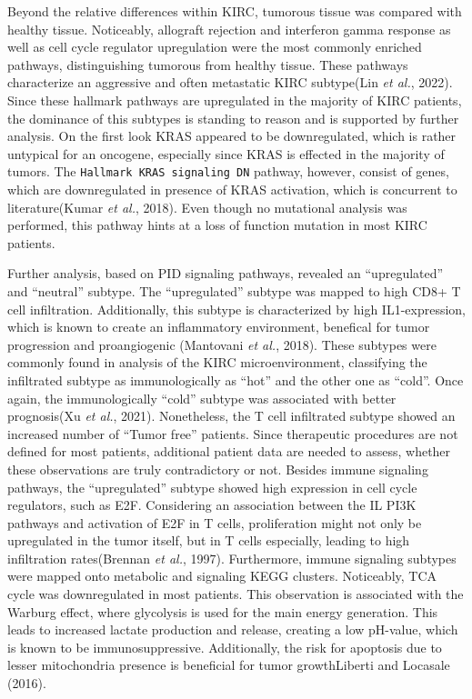 \documentclass[
  parskip,
  oneside]{scrreprt}
\begin{document}
Beyond the relative differences within KIRC, tumorous tissue was
compared with healthy tissue. Noticeably, allograft rejection and
interferon gamma response as well as cell cycle regulator upregulation
were the most commonly enriched pathways, distinguishing tumorous from
healthy tissue. These pathways characterize an aggressive and often
metastatic KIRC subtype(Lin \emph{et al.}, 2022). Since these hallmark
pathways are upregulated in the majority of KIRC patients, the dominance
of this subtypes is standing to reason and is supported by further
analysis. On the first look KRAS appeared to be downregulated, which is
rather untypical for an oncogene, especially since KRAS is effected in
the majority of tumors. The \texttt{Hallmark\ KRAS\ signaling\ DN}
pathway, however, consist of genes, which are downregulated in presence
of KRAS activation, which is concurrent to literature(Kumar \emph{et
al.}, 2018). Even though no mutational analysis was performed, this
pathway hints at a loss of function mutation in most KIRC patients.

Further analysis, based on PID signaling pathways, revealed an
``upregulated'' and ``neutral'' subtype. The ``upregulated'' subtype was
mapped to high CD8+ T cell infiltration. Additionally, this subtype is
characterized by high IL1-expression, which is known to create an
inflammatory environment, benefical for tumor progression and
proangiogenic (Mantovani \emph{et al.}, 2018). These subtypes were
commonly found in analysis of the KIRC microenvironment, classifying the
infiltrated subtype as immunologically as ``hot'' and the other one as
``cold''. Once again, the immunologically ``cold'' subtype was
associated with better prognosis(Xu \emph{et al.}, 2021). Nonetheless,
the T cell infiltrated subtype showed an increased number of ``Tumor
free'' patients. Since therapeutic procedures are not defined for most
patients, additional patient data are needed to assess, whether these
observations are truly contradictory or not. Besides immune signaling
pathways, the ``upregulated'' subtype showed high expression in cell
cycle regulators, such as E2F. Considering an association between the IL
PI3K pathways and activation of E2F in T cells, proliferation might not
only be upregulated in the tumor itself, but in T cells especially,
leading to high infiltration rates(Brennan \emph{et al.}, 1997).
Furthermore, immune signaling subtypes were mapped onto metabolic and
signaling KEGG clusters. Noticeably, TCA cycle was downregulated in most
patients. This observation is associated with the Warburg effect, where
glycolysis is used for the main energy generation. This leads to
increased lactate production and release, creating a low pH-value, which
is known to be immunosuppressive. Additionally, the risk for apoptosis
due to lesser mitochondria presence is beneficial for tumor
growthLiberti and Locasale (2016).
\end{document}
